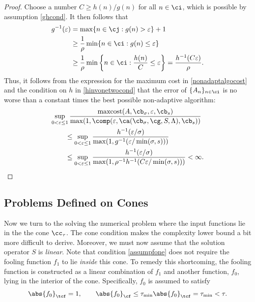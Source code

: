 \documentclass[]{elsarticle}
\DeclareMathOperator{\maxcost}{maxcost}
\theoremstyle{definition}
\theoremstyle{remark}
\newcommand{\Fnorm}[1]{\abs{#1}_{\cf}}
\newcommand{\Ftnorm}[1]{\abs{#1}_{\tcf}}
\begin{document}
\begin{proof}  Choose a number $C \ge h(n)/g(n)$ for all $n \in \ci$, which is possible by assumption \eqref{ghcond}.  It then follows that
\begin{align*}
g^{-1}(\varepsilon) &= \max \{ n \in \cj : g(n) > \varepsilon\}+1 \\ 
& \ge \frac{1}{\rho}\min\{ n \in \ci : g(n) \le \varepsilon\}  \\
& \ge \frac{1}{\rho} \min \left \{ n \in \ci : \frac{h(n)}{C} \le \varepsilon \right\} = \frac{h^{-1}(C \varepsilon)}{\rho}.
\end{align*}
Thus, it follows from the expression for the maximum cost in \eqref{nonadaptalgocost} and the condition on $h$ in \eqref{hinvonetwocond} that the error of $\{A_n\}_{n \in \ci}$ is no worse than a constant times the best possible non-adaptive algorithm:
\begin{align*}
\MoveEqLeft{\sup_{0 < \varepsilon \le 1} \frac{\maxcost(A,\cb_{\sigma},\varepsilon,\cb_{s})}
{\max(1,\comp(\varepsilon,\ca(\cb_{\sigma},\cg,S,\Lambda),\cb_s))}} \\
& \le \sup_{0 < \varepsilon \le 1} \frac{h^{-1}(\varepsilon/\sigma)} {\max(1,g^{-1}(\varepsilon/\min(\sigma,s)))} \\
& \le \sup_{0 < \varepsilon \le 1} \frac{h^{-1}(\varepsilon/\sigma)} {\max(1,\rho^{-1} h^{-1}(C\varepsilon/\min(\sigma,s)))} <\infty.
\end{align*}
\end{proof}

\subsection{Problems Defined on Cones} \label{coneoptsubsec}

Now we turn to the solving the numerical problem where the input functions lie in the the cone $\cc_{\tau}$.  The cone condition makes the complexity lower bound a bit more difficult to derive.  Moreover, we must now assume that the solution operator $S$ is \emph{linear}.  Note that condition \eqref{assumpfone} does not require the fooling function $f_1$ to lie \emph{inside} this cone.  To remedy this shortcoming, the fooling function is constructed as a linear combination of $f_1$ and another function, $f_0$, lying in the interior of the cone.
Specifically, $f_0$ is assumed to satisfy
\begin{equation}
\label{assumpfzero}
\Ftnorm{f_{0}} = 1, \qquad \Fnorm{f_{0}} \le \tau_{\min} \Ftnorm{f_{0}} = \tau_{\min} < \tau.
\end{equation}
\end{document}
